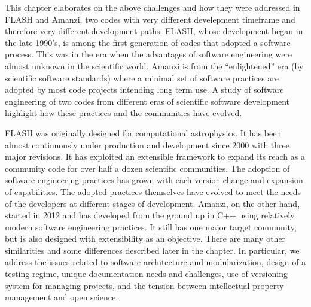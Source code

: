This chapter elaborates on the above challenges and how they were
addressed in FLASH and Amanzi, two codes with very  
different develepment timeframe and therefore very different
development paths. FLASH, whose development began in the late 1990's,
is among the first generation of codes that
adopted a software process. This was in the era when the advantages of
software engineering were almost unknown in the scientific
world. Amanzi is from the ``enlightened'' era (by scientific software
standards) where a minimal set of software practices are adopted by
most code projects intending long term use. A study of software
engineering of two codes from different eras of scientific software
development highlight how these practices  and the communities have
evolved.    

FLASH was originally designed for computational
astrophysics. It has been almost continuously 
under production and development since 2000 with three major
revisions. It has exploited an extensible framework to expand its
reach as a community code for over half a dozen scientific
communities. The adoption of software engineering practices has
grown with each version change and expansion of capabilities. The
adopted practices themselves have evolved to meet the needs of the
developers at different stages of development. Amanzi, on the other
hand, started in 2012 and has developed 
from the ground up in C++ using relatively modern software engineering
practices. It still has one major target community, but is also
designed with extensibility as an objective. There are many other
similarities and some differences described later in the chapter.
In particular, we address the issues related to software
architecture and modularization, design of a testing regime,
unique documentation needs and challenges, use of versioning system 
for managing projects, and the tension between intellectual property
management and open science.

 

